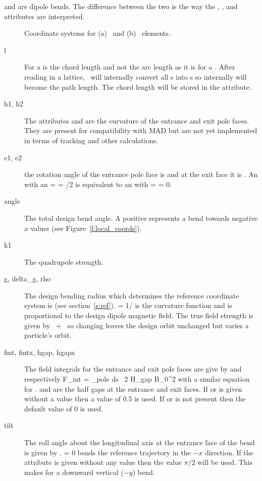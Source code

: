  and  are dipole bends. The difference between
the two is the way the , , and  attributes are interpreted.
\begin{figure}
  \centering
  \hspace{1cm}
  \caption{Coordinate systems for (a) \ and (b) \ 
  elements.}
\end{figure}

  \begin{description}
  \item[l]  
For a   is the chord length and not the arc length as
it is for a .  After reading in a lattice, \bmad\ will
internally convert all \vn{Rbend}s into \vn{Sbend}s so internally
\vn{l} will become the path length. The chord length will be stored in
the \vn{l_chord} attribute.
  \item[h1, h2]
The attributes  and  are the curvature of the entrance
and exit pole faces. They are present for compatibility with MAD but
are not yet implemented in terms of tracking and other calculations.
  \item[e1, e2]
the rotation angle of the entrance pole face is  and at the exit
face it is . An \vn{Sbend} with an  = \vn{e2} =
/2 is equivalent to an  with \vn{e1} =  =
0.
  \item[angle]
The total design bend angle. A positive  represents a
bend towards negative $x$ values (see Figure~\ref{f:local_coords}).
  \item[k1]
The quadrupole strength.
  \item[g, delta\_g, rho]
The design bending radius which determines the reference coordinate
system is  (see section~\ref{s:ref}).  \vn{g} = 1/\vn{rho} is
the curvature function and is proportional to the design dipole
magnetic field. The true field strength is given by
~+~ so changing \vn{delta_g} leaves the design orbit
unchanged but varies a particle's orbit.
  \item[fint, fintx, hgap, hgapx]
The field integrals for the entrance and
exit pole faces are give by  and  respectively
\Begineq
  F_{int} = \int_{pole} \! \! ds \, 
  {2 H_{gap} B_0^2}
\Endeq
with a similar equation for .  and  are
the half gaps at the entrance and exit faces. If  or
 is given without a value then a value of 0.5 is used. If
\vn{fint} or \vn{fintx} is not present then the default value of 0 is
used.
  \item[tilt]
The roll angle about the longitudinal axis at the entrance face of the
bend is given by .   = 0 bends the reference
trajectory in the $-x$ direction.  If the \vn{tilt} attribute is given
without any value then the value $\pi/2$ will be used. This makes for
a downward vertical ($-y$) bend.
  \end{description}


